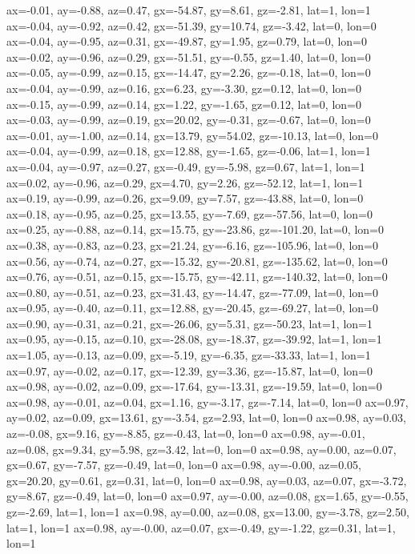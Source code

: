 ax=-0.01, ay=-0.88, az=0.47, gx=-54.87, gy=8.61, gz=-2.81, lat=1, lon=1
ax=-0.04, ay=-0.92, az=0.42, gx=-51.39, gy=10.74, gz=-3.42, lat=0, lon=0
ax=-0.04, ay=-0.95, az=0.31, gx=-49.87, gy=1.95, gz=0.79, lat=0, lon=0
ax=-0.02, ay=-0.96, az=0.29, gx=-51.51, gy=-0.55, gz=1.40, lat=0, lon=0
ax=-0.05, ay=-0.99, az=0.15, gx=-14.47, gy=2.26, gz=-0.18, lat=0, lon=0
ax=-0.04, ay=-0.99, az=0.16, gx=6.23, gy=-3.30, gz=0.12, lat=0, lon=0
ax=-0.15, ay=-0.99, az=0.14, gx=1.22, gy=-1.65, gz=0.12, lat=0, lon=0
ax=-0.03, ay=-0.99, az=0.19, gx=20.02, gy=-0.31, gz=-0.67, lat=0, lon=0
ax=-0.01, ay=-1.00, az=0.14, gx=13.79, gy=54.02, gz=-10.13, lat=0, lon=0
ax=-0.04, ay=-0.99, az=0.18, gx=12.88, gy=-1.65, gz=-0.06, lat=1, lon=1
ax=-0.04, ay=-0.97, az=0.27, gx=-0.49, gy=-5.98, gz=0.67, lat=1, lon=1
ax=0.02, ay=-0.96, az=0.29, gx=4.70, gy=2.26, gz=-52.12, lat=1, lon=1
ax=0.19, ay=-0.99, az=0.26, gx=9.09, gy=7.57, gz=-43.88, lat=0, lon=0
ax=0.18, ay=-0.95, az=0.25, gx=13.55, gy=-7.69, gz=-57.56, lat=0, lon=0
ax=0.25, ay=-0.88, az=0.14, gx=15.75, gy=-23.86, gz=-101.20, lat=0, lon=0
ax=0.38, ay=-0.83, az=0.23, gx=21.24, gy=-6.16, gz=-105.96, lat=0, lon=0
ax=0.56, ay=-0.74, az=0.27, gx=-15.32, gy=-20.81, gz=-135.62, lat=0, lon=0
ax=0.76, ay=-0.51, az=0.15, gx=-15.75, gy=-42.11, gz=-140.32, lat=0, lon=0
ax=0.80, ay=-0.51, az=0.23, gx=31.43, gy=-14.47, gz=-77.09, lat=0, lon=0
ax=0.95, ay=-0.40, az=0.11, gx=12.88, gy=-20.45, gz=-69.27, lat=0, lon=0
ax=0.90, ay=-0.31, az=0.21, gx=-26.06, gy=5.31, gz=-50.23, lat=1, lon=1
ax=0.95, ay=-0.15, az=0.10, gx=-28.08, gy=-18.37, gz=-39.92, lat=1, lon=1
ax=1.05, ay=-0.13, az=0.09, gx=-5.19, gy=-6.35, gz=-33.33, lat=1, lon=1
ax=0.97, ay=-0.02, az=0.17, gx=-12.39, gy=3.36, gz=-15.87, lat=0, lon=0
ax=0.98, ay=-0.02, az=0.09, gx=-17.64, gy=-13.31, gz=-19.59, lat=0, lon=0
ax=0.98, ay=-0.01, az=0.04, gx=1.16, gy=-3.17, gz=-7.14, lat=0, lon=0
ax=0.97, ay=0.02, az=0.09, gx=13.61, gy=-3.54, gz=2.93, lat=0, lon=0
ax=0.98, ay=0.03, az=-0.08, gx=9.16, gy=-8.85, gz=-0.43, lat=0, lon=0
ax=0.98, ay=-0.01, az=0.08, gx=9.34, gy=5.98, gz=3.42, lat=0, lon=0
ax=0.98, ay=0.00, az=0.07, gx=0.67, gy=-7.57, gz=-0.49, lat=0, lon=0
ax=0.98, ay=-0.00, az=0.05, gx=20.20, gy=0.61, gz=0.31, lat=0, lon=0
ax=0.98, ay=0.03, az=0.07, gx=-3.72, gy=8.67, gz=-0.49, lat=0, lon=0
ax=0.97, ay=-0.00, az=0.08, gx=1.65, gy=-0.55, gz=-2.69, lat=1, lon=1
ax=0.98, ay=0.00, az=0.08, gx=13.00, gy=-3.78, gz=2.50, lat=1, lon=1
ax=0.98, ay=-0.00, az=0.07, gx=-0.49, gy=-1.22, gz=0.31, lat=1, lon=1

